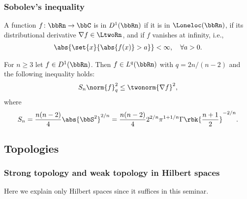 \documentclass[openany, a4paper, oneside]{jsbook}
\begin{document}
\subsubsection{Sobolev's inequality}

A function $f \colon \bbRn \to \bbC$ is in $D^1 (\bbRn)$ if it is in $\Loneloc (\bbRn)$, if its distributional derivative $\nabla f \in \LtwoRn$,
and if $f$ vanishes at infinity, i.e.,
\begin{align}
 \abs{\set{x}{\abs{f (x)} > a}} < \infty, \quad \forall a > 0.
\end{align}
\begin{thm}\label{Lieb-Loss_Analysis_chap11_4}
 For $n \geq 3$ let $f \in D^1 (\bbRn)$.
 Then $f \in L^q (\bbRn)$ with $q = 2n/ (n-2)$ and the following inequality holds:
\begin{align}
 S_n \norm{f}_{q}^2
 \leq
 \twonorm{\nabla f}^2,
\end{align}
where
\begin{align}
 S_n
 =
 \frac{n (n-2)}{4} \abs{\bbS^2}^{2/n}
 =
 \frac{n (n-2)}{4} 2^{2/n} \pi^{1 + 1/n} \Gamma \rbk{\frac{n+1}{2}}^{-2/n}.
\end{align}
\end{thm}
\subsection{Topologies \label{Lieb-Loss_Analysis_chap11_36}}

\subsubsection{Strong topology and weak topology in Hilbert spaces}

Here we explain only Hilbert spaces since it suffices in this seminar.
\end{document}
